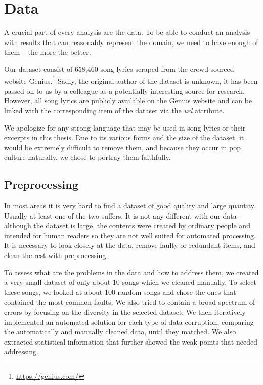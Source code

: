 \chapter{Data}\label{data}

A crucial part of every analysis are the data. To be able to conduct an analysis with results that can reasonably represent the domain, we need to have enough of them -- the more the better. 

Our dataset consist of 658,460 song lyrics scraped from the crowd-sourced website 
Genius.\footnote{\url{https://genius.com/}} Sadly, the original author of the dataset is unknown, it has been passed on to us by a colleague as a potentially interesting source for research. However, all song lyrics are publicly available on the Genius website and can be linked with the corresponding item of the dataset via the \textit{url} attribute.

We apologize for any strong language that may be used in song lyrics or their excerpts in this thesis. Due to its various forms and the size of the dataset, it would be extremely difficult to remove them, and because they occur in pop culture naturally, we chose to portray them faithfully.

\section{Preprocessing}

In most areas it is very hard to find a dataset of good quality and large quantity. Usually at least one of the two suffers. It is not any different with our data -- although the dataset is large, the contents were created by ordinary people and intended for human readers so they are not well suited for automated processing. It is necessary to look closely at the data, remove faulty or redundant items, and clean the rest with preprocessing.

To assess what are the problems in the data and how to address them, we created a very small dataset of only about 10 songs which we cleaned manually. To select these songs, we looked at about 100 random songs and chose the ones that contained the most common faults. We also tried to contain a broad spectrum of errors by focusing on the diversity in the selected dataset. We then iteratively implemented an automated solution for each type of data corruption, comparing the automatically and manually cleaned data, until they matched. We also extracted statistical information that further showed the weak points that needed addressing.

